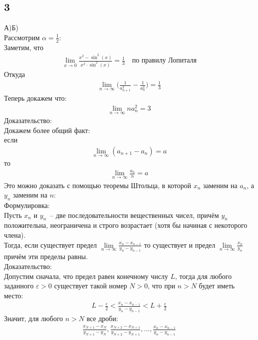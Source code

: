 		\subsection{3}
		А)Б)\\
		Рассмотрим $\alpha = \frac{1}{2}$:\\
		Заметим, что 
		\begin{gather*}
			\lim\limits_{x \to 0} \frac{x^2 - \sin^2(x)}{x^2 \cdot \sin^2(x)} = \frac{1}{3} \quad \text{по правилу Лопиталя}
		\end{gather*}
		Откуда
		\begin{gather*}
			\lim\limits_{n \to \infty} \bigg( \frac{1}{a^2_{n+1}} - \frac{1}{a^2_{n}} \bigg) = \frac{1}{3}
		\end{gather*}
		Теперь докажем что:
		\begin{gather*}
			\lim\limits_{n \to \infty} na^2_n = 3
		\end{gather*}
		Доказательство:\\
		Докажем более общий факт:\\
		если
		\begin{gather*}
			\lim\limits_{n \to \infty} (a_{n+1} - a_{n}) = a
		\end{gather*}
		то
		\begin{gather*}
			\lim\limits_{n \to \infty} \frac{a_n}{n} = a
		\end{gather*}
		Это можно доказать с помощью теоремы Штольца, в которой $x_n$ заменим на $a_{n}$, а $y_n$ заменим на $n$:\\
		Формулировка:\\
		Пусть $x_n$ и $y_n$ -- две последовательности вещественных чисел, причём $y_n$ положительна, неограничена и строго возрастает (хотя бы начиная с некоторого члена).\\
		Тогда, если существует предел
		$\lim\limits_{n \to \infty} \frac{x_n - x_{n-1}}{y_n - y_{n-1}}$
		то существует и предел
		$\lim\limits_{n \to \infty} \frac{x_n}{y_n}$
		причём эти пределы равны.\\
		Доказательство:\\
		Допустим сначала, что предел равен конечному числу $L$, тогда для любого заданного $\varepsilon > 0$ существует такой номер $N > 0$, что при $n > N$ будет иметь место:
		\begin{gather*}
			L - \frac{\varepsilon}{2} < \frac{x_n - x_{n-1}}{y_n - y_{n-1}} < L + \frac{\varepsilon}{2}
		\end{gather*}		
		Значит, для любого $n > N$ все дроби:
		\begin{gather*}
			\frac{x_{N+1} - x_N}{y_{N+1} - y_N}, \frac{x_{N+2} - x_{N+1}}{y_{N+2} - y_{N+1}},...,\frac{x_n - x_{n-1}}{y_n - y_{n-1}}
		\end{gather*}
